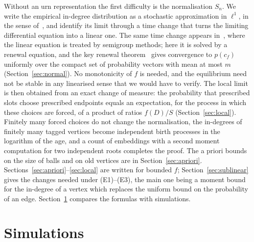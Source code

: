 \documentclass[11pt]{amsart}
\theoremstyle{definition}
\begin{document}
Without an urn representation the first difficulty is the normalisation $S_n$. We write the empirical in-degree
distribution as a stochastic approximation in $\ell^1$, in the sense of~\cite{Benaim,Pemantle}, and identify its
limit through a time change that turns
the limiting differential equation into a linear one. The same time change appears in~\cite{CSV}, where the linear
equation is treated by semigroup methods; here it is solved by a renewal equation, and the
key renewal theorem~\cite[Chapter~XI]{Feller} gives convergence to $p(c_f)$ uniformly over the compact set of probability vectors with mean
at most $m$ (Section~\ref{sec:normal}). No monotonicity of $f$ is needed, and the equilibrium need not be stable
in any linearised sense that we would have to verify. The local limit is then obtained from an exact change of
measure: the probability that prescribed slots choose prescribed endpoints equals an expectation, for the
process in which these choices are forced, of a product of ratios $f(D)/S$ (Section~\ref{sec:local}). Finitely
many forced choices do not change the normalisation, the in-degrees of finitely many tagged vertices become
independent birth processes in the logarithm of the age, and a count of embeddings with a second moment
computation for two independent roots completes the proof. The a priori bounds on the size of balls and on old
vertices are in Section~\ref{sec:apriori}. Sections~\ref{sec:apriori}--\ref{sec:local} are written for bounded
$f$; Section~\ref{sec:sublinear} gives the changes needed under \textup{(E1)--(E3)}, the main one being a moment
bound for the in-degree of a vertex which replaces the uniform bound on the probability of an edge.
Section~\ref{sec:sim} compares the formulas with simulations.






\section{Simulations}\label{sec:sim}
\end{document}
